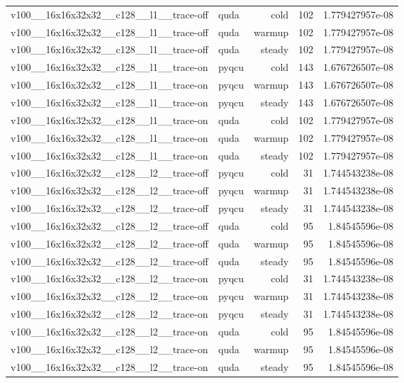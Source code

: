 \begin{table}[htbp]
\begin{tabular}{@{}llrrr@{}}
v100\_\_16x16x32x32\_\_c128\_\_l1\_\_trace-off & quda & cold & 102 & 1.779427957e-08 \\
v100\_\_16x16x32x32\_\_c128\_\_l1\_\_trace-off & quda & warmup & 102 & 1.779427957e-08 \\
v100\_\_16x16x32x32\_\_c128\_\_l1\_\_trace-off & quda & steady & 102 & 1.779427957e-08 \\
v100\_\_16x16x32x32\_\_c128\_\_l1\_\_trace-on & pyqcu & cold & 143 & 1.676726507e-08 \\
v100\_\_16x16x32x32\_\_c128\_\_l1\_\_trace-on & pyqcu & warmup & 143 & 1.676726507e-08 \\
v100\_\_16x16x32x32\_\_c128\_\_l1\_\_trace-on & pyqcu & steady & 143 & 1.676726507e-08 \\
v100\_\_16x16x32x32\_\_c128\_\_l1\_\_trace-on & quda & cold & 102 & 1.779427957e-08 \\
v100\_\_16x16x32x32\_\_c128\_\_l1\_\_trace-on & quda & warmup & 102 & 1.779427957e-08 \\
v100\_\_16x16x32x32\_\_c128\_\_l1\_\_trace-on & quda & steady & 102 & 1.779427957e-08 \\
v100\_\_16x16x32x32\_\_c128\_\_l2\_\_trace-off & pyqcu & cold & 31 & 1.744543238e-08 \\
v100\_\_16x16x32x32\_\_c128\_\_l2\_\_trace-off & pyqcu & warmup & 31 & 1.744543238e-08 \\
v100\_\_16x16x32x32\_\_c128\_\_l2\_\_trace-off & pyqcu & steady & 31 & 1.744543238e-08 \\
v100\_\_16x16x32x32\_\_c128\_\_l2\_\_trace-off & quda & cold & 95 & 1.84545596e-08 \\
v100\_\_16x16x32x32\_\_c128\_\_l2\_\_trace-off & quda & warmup & 95 & 1.84545596e-08 \\
v100\_\_16x16x32x32\_\_c128\_\_l2\_\_trace-off & quda & steady & 95 & 1.84545596e-08 \\
v100\_\_16x16x32x32\_\_c128\_\_l2\_\_trace-on & pyqcu & cold & 31 & 1.744543238e-08 \\
v100\_\_16x16x32x32\_\_c128\_\_l2\_\_trace-on & pyqcu & warmup & 31 & 1.744543238e-08 \\
v100\_\_16x16x32x32\_\_c128\_\_l2\_\_trace-on & pyqcu & steady & 31 & 1.744543238e-08 \\
v100\_\_16x16x32x32\_\_c128\_\_l2\_\_trace-on & quda & cold & 95 & 1.84545596e-08 \\
v100\_\_16x16x32x32\_\_c128\_\_l2\_\_trace-on & quda & warmup & 95 & 1.84545596e-08 \\
v100\_\_16x16x32x32\_\_c128\_\_l2\_\_trace-on & quda & steady & 95 & 1.84545596e-08 \\

\end{tabular}
\end{table}
